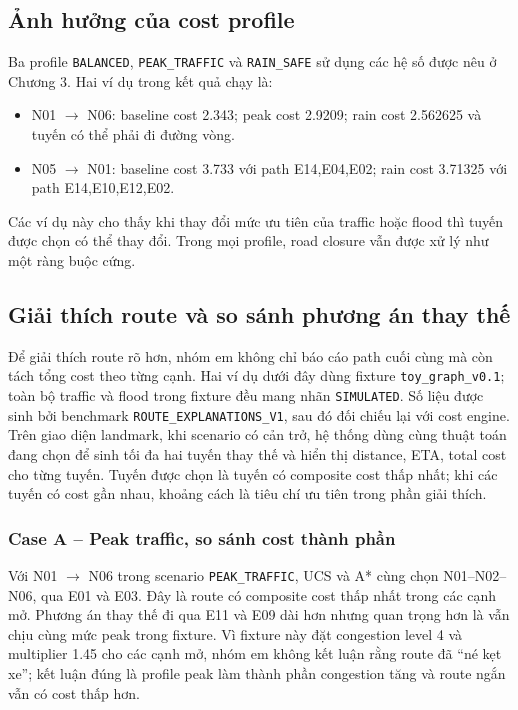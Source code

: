 \subsection{Ảnh hưởng của cost profile}
Ba profile \texttt{BALANCED}, \texttt{PEAK\_TRAFFIC} và \texttt{RAIN\_SAFE} sử dụng các hệ số được nêu ở Chương 3. Hai ví dụ trong kết quả chạy là:
\begin{itemize}
\item N01 \(\rightarrow\) N06: baseline cost 2.343; peak cost 2.9209; rain cost 2.562625 và tuyến có thể phải đi đường vòng.
\item N05 \(\rightarrow\) N01: baseline cost 3.733 với path E14,E04,E02; rain cost 3.71325 với path E14,E10,E12,E02.
\end{itemize}
Các ví dụ này cho thấy khi thay đổi mức ưu tiên của traffic hoặc flood thì tuyến được chọn có thể thay đổi. Trong mọi profile, road closure vẫn được xử lý như một ràng buộc cứng.

\subsection{Giải thích route và so sánh phương án thay thế}
Để giải thích route rõ hơn, nhóm em không chỉ báo cáo path cuối cùng mà còn tách tổng cost theo từng cạnh. Hai ví dụ dưới đây dùng fixture \texttt{toy\_graph\_v0.1}; toàn bộ traffic và flood trong fixture đều mang nhãn \texttt{SIMULATED}. Số liệu được sinh bởi benchmark \texttt{ROUTE\_EXPLANATIONS\_V1}, sau đó đối chiếu lại với cost engine. Trên giao diện landmark, khi scenario có cản trở, hệ thống dùng cùng thuật toán đang chọn để sinh tối đa hai tuyến thay thế và hiển thị distance, ETA, total cost cho từng tuyến. Tuyến được chọn là tuyến có composite cost thấp nhất; khi các tuyến có cost gần nhau, khoảng cách là tiêu chí ưu tiên trong phần giải thích.

\subsubsection{Case A -- Peak traffic, so sánh cost thành phần}
Với N01 \(\rightarrow\) N06 trong scenario \texttt{PEAK\_TRAFFIC}, UCS và A* cùng chọn N01--N02--N06, qua E01 và E03. Đây là route có composite cost thấp nhất trong các cạnh mở. Phương án thay thế đi qua E11 và E09 dài hơn nhưng quan trọng hơn là vẫn chịu cùng mức peak trong fixture. Vì fixture này đặt congestion level 4 và multiplier 1.45 cho các cạnh mở, nhóm em không kết luận rằng route đã ``né kẹt xe''; kết luận đúng là profile peak làm thành phần congestion tăng và route ngắn vẫn có cost thấp hơn.

